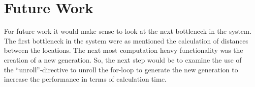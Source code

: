
\chapter{Future Work}
For future work it would make sense to look at the next bottleneck in the system. The first bottleneck in the system were as mentioned the calculation of distances between the locations. The next most computation heavy functionality was the creation of a new generation. So, the next step would be to examine the use of the “unroll”-directive to unroll the for-loop to generate the new generation to increase the performance in terms of calculation time. 